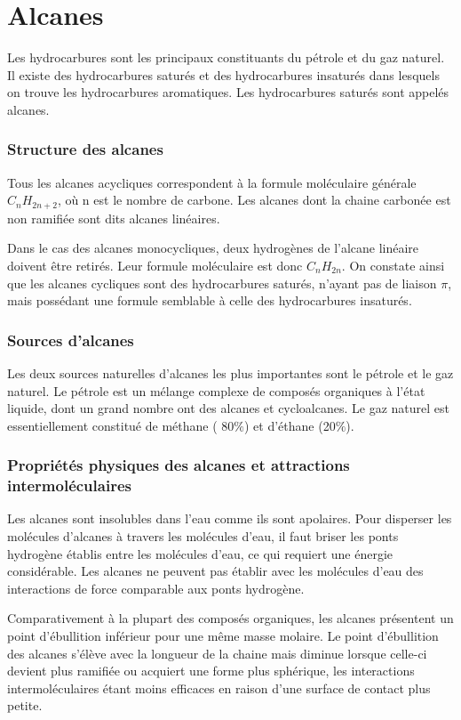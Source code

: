 \part{Alcanes}
Les hydrocarbures sont les principaux constituants du pétrole et du gaz naturel.
Il existe des hydrocarbures saturés et des hydrocarbures insaturés dans lesquels on trouve les hydrocarbures aromatiques.
Les hydrocarbures saturés sont appelés alcanes.
\section{Structure des alcanes}
Tous les alcanes acycliques correspondent à la formule moléculaire générale $C_nH_{2n+2}$, où n est le nombre de carbone.
Les alcanes dont la chaine carbonée est non ramifiée sont dits alcanes linéaires.

Dans le cas des alcanes monocycliques, deux hydrogènes de l'alcane linéaire doivent être retirés.
Leur formule moléculaire est donc $C_nH_{2n}$.
On constate ainsi que les alcanes cycliques sont des hydrocarbures saturés, n'ayant pas de liaison $\pi$, mais possédant une formule semblable à  celle des hydrocarbures insaturés.



\section{Sources d'alcanes}

Les deux sources naturelles d'alcanes les plus importantes sont le pétrole et le gaz naturel.
Le pétrole est un mélange complexe de composés organiques à l'état liquide, dont un grand nombre ont des alcanes et cycloalcanes.
Le gaz naturel est essentiellement constitué de méthane ( 80$\%$) et d'éthane (20$\%$).


\section{Propriétés physiques des alcanes et attractions intermoléculaires}

Les alcanes sont insolubles dans l'eau comme ils sont apolaires.
Pour disperser les molécules d'alcanes à travers les molécules d'eau, il faut briser les ponts hydrogène établis entre les molécules d'eau, ce qui requiert une énergie considérable.
Les alcanes ne peuvent pas établir avec les molécules d'eau des interactions de force comparable aux ponts hydrogène.

Comparativement à la plupart des composés organiques, les alcanes présentent un point d'ébullition inférieur pour une même masse molaire.
Le point d'ébullition des alcanes s'élève avec la longueur de la chaine mais diminue lorsque celle-ci devient plus ramifiée ou acquiert une forme plus sphérique, les interactions intermoléculaires étant moins efficaces en raison d'une surface de contact plus petite.


